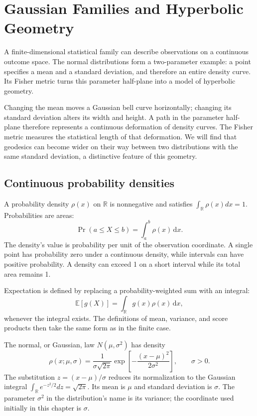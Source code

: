 \documentclass[11pt,oneside,openany]{book}
\theoremstyle{definition}
\theoremstyle{remark}
\newcommand{\R}{\mathbb{R}}
\newcommand{\E}{\mathbb{E}}
\newcommand{\dd}{\,\mathrm{d}}
\numberwithin{equation}{chapter}
\begin{document}
\mainmatter
\setcounter{chapter}{9}
\chapter{Gaussian Families and Hyperbolic Geometry}
\label{ch:gaussian}

A finite-dimensional statistical family can describe observations on a continuous outcome space. The normal distributions form a two-parameter example: a point specifies a mean and a standard deviation, and therefore an entire density curve. Its Fisher metric turns this parameter half-plane into a model of hyperbolic geometry.

Changing the mean moves a Gaussian bell curve horizontally; changing its standard deviation alters its width and height. A path in the parameter half-plane therefore represents a continuous deformation of density curves. The Fisher metric measures the statistical length of that deformation. We will find that geodesics can become wider on their way between two distributions with the same standard deviation, a distinctive feature of this geometry.

\section{Continuous probability densities}
A probability density $\rho(x)$ on $\R$ is nonnegative and satisfies $\int_{\R}\rho(x)dx=1$. Probabilities are areas:
\[
\Pr(a\leq X\leq b)=\int_a^b\rho(x)\dd x.
\]
The density's value is probability per unit of the observation coordinate. A single point has probability zero under a continuous density, while intervals can have positive probability. A density can exceed 1 on a short interval while its total area remains 1.

Expectation is defined by replacing a probability-weighted sum with an integral:
\[
\E[g(X)]=\int_{\R}g(x)\rho(x)\dd x,
\]
whenever the integral exists. The definitions of mean, variance, and score products then take the same form as in the finite case.

The normal, or Gaussian, law $N(\mu,\sigma^2)$ has density
\begin{equation}\label{eq:gaussiandensity}
\rho(x;\mu,\sigma)=\frac1{\sigma\sqrt{2\pi}}
\exp\left[-\frac{(x-\mu)^2}{2\sigma^2}\right],\qquad \sigma>0.
\end{equation}
The substitution $z=(x-\mu)/\sigma$ reduces its normalization to the Gaussian integral $\int_{\R}e^{-z^2/2}dz=\sqrt{2\pi}$. Its mean is $\mu$ and standard deviation is $\sigma$. The parameter $\sigma^2$ in the distribution's name is its variance; the coordinate used initially in this chapter is $\sigma$.
\end{document}
